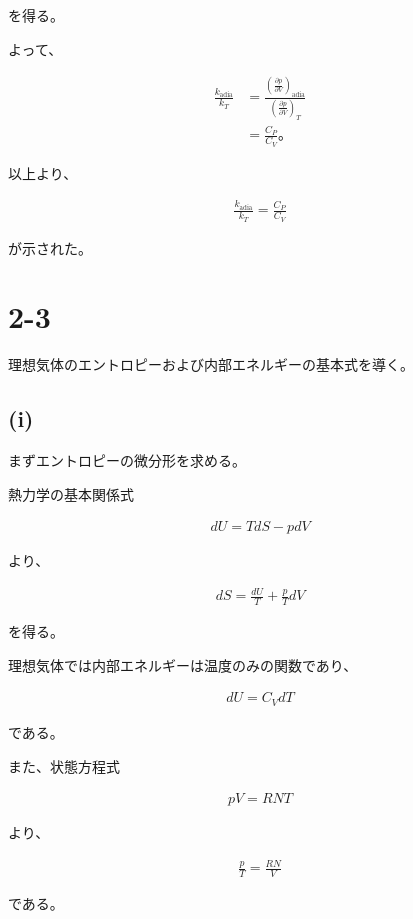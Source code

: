 \documentclass[platex,dvipdfmx,a4paper]{jsarticle}
\begin{document}
を得る。

よって、

\begin{align*}
\frac{k_{\mathrm{adia}}}{k_T}
&=
\frac{
\left(\frac{\partial p}{\partial V}\right)_{\mathrm{adia}}
}{
\left(\frac{\partial p}{\partial V}\right)_T
}
\\
&=
\frac{C_P}{C_V}。
\end{align*}

以上より、

\begin{align*}
\frac{k_{\mathrm{adia}}}{k_T}
=
\frac{C_P}{C_V}
\end{align*}

が示された。
\section{2-3}

理想気体のエントロピーおよび内部エネルギーの基本式を導く。

\subsection{(i)}

まずエントロピーの微分形を求める。

熱力学の基本関係式

\begin{align*}
dU=TdS-pdV
\end{align*}

より、

\begin{align*}
dS
=
\frac{dU}{T}
+\frac{p}{T}dV
\end{align*}

を得る。

理想気体では内部エネルギーは温度のみの関数であり、

\begin{align*}
dU=C_VdT
\end{align*}

である。

また、状態方程式

\begin{align*}
pV=RNT
\end{align*}

より、

\begin{align*}
\frac{p}{T}
=
\frac{RN}{V}
\end{align*}

である。
\end{document}
